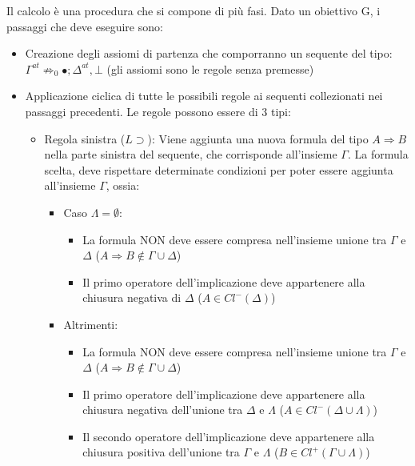 \documentclass[\main/tesi.tex]{subfiles}
\begin{document}
Il calcolo è una procedura che si compone di più fasi. Dato un obiettivo G, i passaggi che deve eseguire sono:
\begin{itemize}
    \item Creazione degli assiomi di partenza che comporranno un sequente del tipo: $\Gamma^{at} \not\Rightarrow_0 \bullet; \Delta^{at}, \bot$ (gli assiomi sono le regole senza premesse)
    \item Applicazione ciclica di tutte le possibili regole ai sequenti collezionati nei passaggi precedenti. Le regole possono essere di 3 tipi:
          \begin{itemize}
              \item Regola sinistra ($L\supset$): Viene aggiunta una nuova formula del tipo $A \Rightarrow B$ nella parte sinistra del sequente, che corrisponde all'insieme $\Gamma$. La formula scelta, deve rispettare determinate condizioni per poter essere aggiunta all'insieme $\Gamma$, ossia:
                    \begin{itemize}
                        \item Caso $\Lambda = \emptyset$:
                              \begin{itemize}
                                  \item La formula NON deve essere compresa nell'insieme unione tra $\Gamma$ e $\Delta$ ($A \Rightarrow B \notin \Gamma \cup \Delta$)
                                  \item Il primo operatore dell'implicazione deve appartenere alla chiusura negativa di $\Delta$ ($A \in Cl^{-}(\Delta)$)
                              \end{itemize}
                        \item Altrimenti:
                              \begin{itemize}
                                  \item La formula NON deve essere compresa nell'insieme unione tra $\Gamma$ e $\Delta$ ($A \Rightarrow B \notin \Gamma \cup \Delta$)
                                  \item Il primo operatore dell'implicazione deve appartenere alla chiusura negativa dell'unione tra $\Delta$ e $\Lambda$ ($A \in Cl^{-}(\Delta \cup \Lambda)$)
                                  \item Il secondo operatore dell'implicazione deve appartenere alla chiusura positiva dell'unione tra $\Gamma$ e $\Lambda$ ($B \in Cl^{+}(\Gamma \cup \Lambda)$)
                              \end{itemize}

\end{itemize}
\end{itemize}
\end{itemize}
\end{document}
